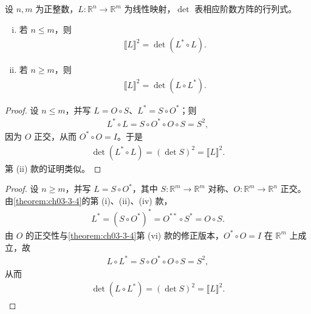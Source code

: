 \documentclass[../../main.tex]{subfiles}%
\begin{document}
\begin{theorem}\label{theorem:ch03-3-6}
设 $n,m$ 为正整数，$L:\mathbb{R}^n\to\mathbb{R}^m$ 为线性映射，$\det$ 表相应阶数方阵的行列式。
\begin{enumerate}[(i)]
\item 若 $n\leqslant m$，则
\begin{align*}
\llbracket L\rrbracket^2=\det(L^*\circ L).
\end{align*}
\item 若 $n\geqslant m$，则
\begin{align*}
\llbracket L\rrbracket^2=\det(L\circ L^*).
\end{align*}
\end{enumerate}
\end{theorem}

\begin{proof}
设 $n\leqslant m$，并写 $L=O\circ S$、$L^*=S\circ O^*$；则
\begin{align*}
L^*\circ L=S\circ O^*\circ O\circ S=S^2,
\end{align*}
因为 $O$ 正交，从而 $O^*\circ O=I$。于是
\begin{align*}
\det(L^*\circ L)=(\det S)^2=\llbracket L\rrbracket^2.
\end{align*}
第 (ii) 款的证明类似。
\end{proof}

\begin{proof}
设 $n\geqslant m$，并写 $L=S\circ O^*$，其中 $S:\mathbb{R}^m\to\mathbb{R}^m$ 对称、$O:\mathbb{R}^m\to\mathbb{R}^n$ 正交。由\cref{theorem:ch03-3-4}的第 (i)、(ii)、(iv) 款，%
\begin{align*}
L^*=(S\circ O^*)^*=O^{**}\circ S^*=O\circ S.
\end{align*}
由 $O$ 的正交性与\cref{theorem:ch03-3-4}第 (vi) 款的修正版本，$O^*\circ O=I$ 在 $\mathbb{R}^m$ 上成立，故%
\begin{align*}
L\circ L^*=S\circ O^*\circ O\circ S=S^2,
\end{align*}
从而
\begin{align*}
\det(L\circ L^*)=(\det S)^2=\llbracket L\rrbracket^2.
\end{align*}
\end{proof}
\end{document}
